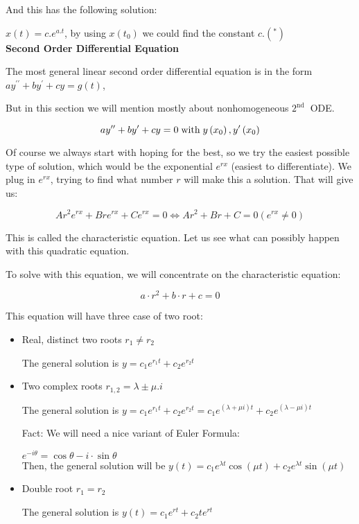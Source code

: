 \documentclass[a4paper]{article}
\begin{document}
And this has the following solution:

$x(t)=c . e^{a . t}$, by using $x\left(t_{0}\right)$ we could find the constant $c .\left(^{*}\right)$\\


\textbf{Second Order Differential Equation}

The most general linear second order differential equation is in the form $a y^{\prime \prime}+b y^{\prime}+c y=g(t)$,

But in this section we will mention mostly about nonhomogeneous $2^{\text {nd }}$ ODE.

$$a y^{\prime \prime}+b y^{\prime}+c y=0 \text{\;with\;} y\left(x_{0}\right), y^{\prime}\left(x_{0}\right)$$

Of course we always start with hoping for the best, so we try the easiest possible type of solution, which would be the exponential $e^{r x}$ (easiest to differentiate). We plug in $e^{r x}$, trying to find what number $r$ will make this a solution. That will give us:

$$A r^{2} e^{r x}+B r e^{r x}+C e^{r x}=0 \Leftrightarrow A r^{2}+B r+C=0\left(e^{r x} \neq 0\right)$$

This is called the characteristic equation. Let us see what can possibly happen with this quadratic equation.

To solve with this equation, we will concentrate on the characteristic equation:

$$a \cdot r^{2}+b \cdot r+c=0$$

This equation will have three case of two root:

\begin{itemize}
	\item Real, distinct two roots $r_{1} \neq r_{2}$
	
	
	The general solution is $y=c_{1} e^{r_{1} t}+c_{2} e^{r_{2} t}$
	
	\item Two complex roots $r_{1,2}=\lambda \pm \mu . i$
	
	
	The general solution is $y=c_{1} e^{r_{1} t}+c_{2} e^{r_{2} t}=c_{1} e^{(\lambda+\mu i) t}+c_{2} e^{(\lambda-\mu i) t}$
	
	Fact: We will need a nice variant of Euler Formula:
	
	$e^{-i \theta}=\cos \theta-i \cdot \sin \theta$ \\
 Then, the general solution will be $y(t)=c_{1} e^{\lambda t} \cos (\mu t)+c_{2} e^{\lambda t} \sin (\mu t)$
	
	\item Double root $r_{1}=r_{2}$
	
	The general solution is $y(t)=c_{1} e^{r t}+c_{2} t e^{r t}$
\end{itemize}
\end{document}
